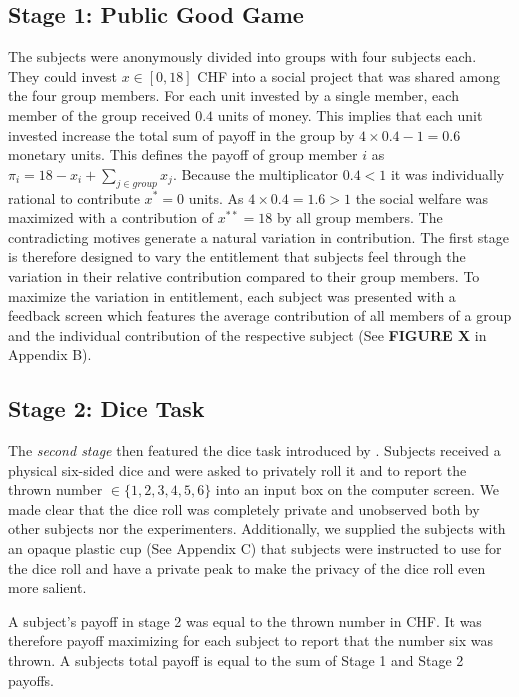\documentclass[12pt, a4paper]{article}
\begin{document}
\subsection*{Stage 1: Public Good Game}
The subjects were anonymously divided into groups with four subjects each. They could invest $x \in [0,18]$ CHF into a social project that was shared among the four group members. For each unit invested by a single member, each member of the group received $0.4$ units of money. This implies that each  unit invested increase the total sum of payoff in the group by $4\times 0.4 - 1 = 0.6$ monetary units. This defines the payoff of group member $i$ as $\pi_i = 18 - x_i + \sum_{j \in \mathit{group}} x_j$. Because the multiplicator $0.4<1$ it was individually rational to contribute $x^*=0$ units. As $4\times 0.4 =1.6>1$ the social welfare was maximized with a contribution of $x^{**}=18$ by all group members. The contradicting motives generate a natural variation in contribution. The first stage is therefore designed to vary the entitlement that subjects feel through the variation in their relative contribution compared to their group members. To maximize the variation in entitlement, each subject was presented with a feedback screen which features the average contribution of all members of a group and the individual contribution of the respective subject (See \textbf{FIGURE X} in Appendix B).

\subsection*{Stage 2: Dice Task}
The \emph{second stage} then featured the dice task introduced by \citet{Fischbacher2013Lies}. Subjects received a physical six-sided dice and were asked to privately roll it and to report the thrown number $\in \{1,2,3,4,5,6\}$ into an input box on the computer screen. We made clear that the dice roll was completely private and unobserved both by other subjects nor the experimenters. Additionally, we supplied the subjects with an opaque plastic cup (See Appendix C) that subjects were instructed to use for the dice roll and have a private peak to make the privacy of the dice roll even more salient.

A subject's payoff in stage 2 was equal to the thrown number in CHF. It was therefore payoff maximizing for each subject to report that the number six was thrown. A subjects total payoff is equal to the sum of Stage 1 and Stage 2 payoffs.

\end{document}
